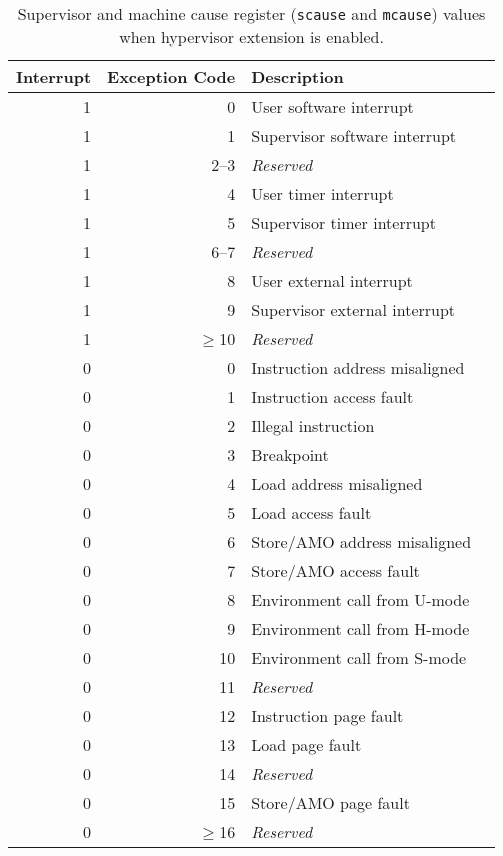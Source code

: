 \begin{table*}[h!]
\begin{center}
\begin{tabular}{|r|r|l|l|}

  \hline
  Interrupt & Exception Code  & Description \\
  \hline	 
  1         & 0               & User software interrupt \\
  1         & 1               & Supervisor software interrupt \\
  1         & 2--3            & {\em Reserved} \\
  1         & 4               & User timer interrupt \\
  1         & 5               & Supervisor timer interrupt \\
  1         & 6--7            & {\em Reserved} \\
  1         & 8               & User external interrupt \\
  1         & 9               & Supervisor external interrupt \\
  1         & $\ge$10         & {\em Reserved} \\ \hline
  0         & 0               & Instruction address misaligned \\
  0         & 1               & Instruction access fault \\
  0         & 2               & Illegal instruction \\   
  0         & 3               & Breakpoint \\
  0         & 4               & Load address misaligned \\
  0         & 5               & Load access fault \\
  0         & 6               & Store/AMO address misaligned \\
  0         & 7               & Store/AMO access fault \\
  0         & 8               & Environment call from U-mode \\
  0         & 9               & Environment call from H-mode \\
  0         & 10              & Environment call from S-mode \\
  0         & 11              & {\em Reserved} \\
  0         & 12              & Instruction page fault \\
  0         & 13              & Load page fault \\
  0         & 14              & {\em Reserved} \\
  0         & 15              & Store/AMO page fault \\
  0         & $\ge$16         & {\em Reserved} \\
  \hline
\end{tabular}
\end{center}
\caption{Supervisor and machine cause register ({\tt scause} and {\tt mcause}) values when hypervisor extension is enabled.}
\label{hcauses}
\end{table*}

